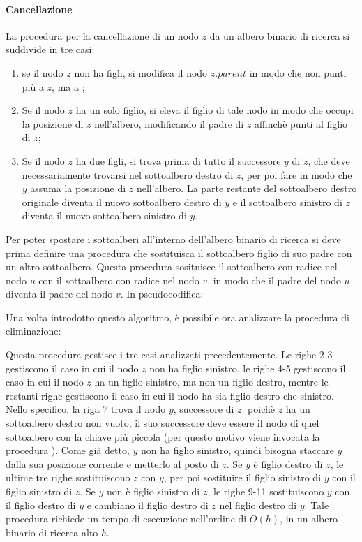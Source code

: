 \paragraph{Cancellazione}
La procedura per la cancellazione di un nodo \(z\) da un albero binario di ricerca si suddivide in tre casi:
\begin{enumerate}
  \item se il nodo \(z\) non ha figli, si modifica il nodo \(z.parent\) in modo che non punti più a \(z\), ma a ;
  \item Se il nodo \(z\) ha un solo figlio, si eleva il figlio di tale nodo in modo che occupi la posizione di \(z\) nell'albero, modificando il padre di \(z\) affinchè punti al figlio di \(z\);
  \item Se il nodo \(z\) ha due figli, si trova prima di tutto il successore \(y\) di \(z\), che deve necessariamente trovarsi nel sottoalbero destro di \(z\), per poi fare in modo che \(y\) assuma la posizione di \(z\) nell'albero. La parte restante del sottoalbero destro originale diventa il nuovo sottoalbero destro di \(y\) e il sottoalbero sinistro di \(z\) diventa il nuovo sottoalbero sinistro di \(y\).
\end{enumerate}

Per poter spostare i sottoalberi all'interno dell'albero binario di ricerca si deve prima definire una procedura che sostituisca il sottoalbero figlio di suo padre con un altro sottoalbero. Questa procedura sosituisce il sottoalbero con radice nel nodo \(u\) con il sottoalbero con radice nel nodo \(v\), in modo che il padre del nodo \(u\) diventa il padre del nodo \(v\). In pseudocodifica:



Una volta introdotto questo algoritmo, è possibile ora analizzare la procedura di eliminazione:



Questa procedura gestisce i tre casi analizzati precedentemente. Le righe 2-3 gestiscono il caso in cui il nodo \(z\) non ha figlio sinistro, le righe 4-5 gestiscono il caso in cui il nodo \(z\) ha un figlio sinistro, ma non un figlio destro, mentre le restanti righe gestiscono il caso in cui il nodo ha sia figlio destro che sinistro. Nello specifico, la riga 7 trova il nodo \(y\), successore di \(z\): poichè \(z\) ha un sottoalbero destro non vuoto, il suo successore deve essere il nodo di quel sottoalbero con la chiave più piccola (per questo motivo viene invocata la procedura ). Come già detto, \(y\) non ha figlio sinistro, quindi bisogna staccare \(y\) dalla sua posizione corrente e metterlo al posto di \(z\). Se \(y\) è figlio destro di \(z\), le ultime tre righe sostituiscono \(z\) con \(y\), per poi sostituire il figlio sinistro di \(y\) con il figlio sinistro di \(z\). Se \(y\) non è figlio sinistro di \(z\), le righe 9-11 sostituiscono \(y\) con il figlio destro di \(y\) e cambiano il figlio destro di \(z\) nel figlio destro di \(y\). Tale procedura richiede un tempo di esecuzione nell'ordine di \(O(h)\), in un albero binario di ricerca alto \(h\).


